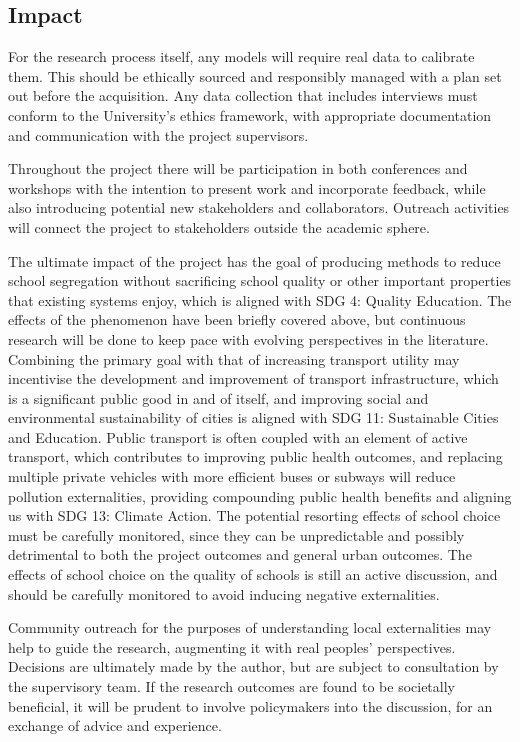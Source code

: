 \documentclass{article}
\begin{document}
\begin{multicols}{2}
\section{Impact}
For the research process itself, any models will require real data to calibrate them. This should be ethically sourced and responsibly managed with a plan set out before the acquisition. Any data collection that includes interviews must conform to the University's ethics framework, with appropriate documentation and communication with the project supervisors.

Throughout the project there will be participation in both conferences and workshops with the intention to present work and incorporate feedback, while also introducing potential new stakeholders and collaborators. Outreach activities will connect the project to stakeholders outside the academic sphere.

The ultimate impact of the project has the goal of producing methods to reduce school segregation without sacrificing school quality or other important properties that existing systems enjoy, which is aligned with SDG 4: Quality Education. The effects of the phenomenon have been briefly covered above, but continuous research will be done to keep pace with evolving perspectives in the literature. Combining the primary goal with that of increasing transport utility may incentivise the development and improvement of transport infrastructure, which is a significant public good in and of itself, and improving social and environmental sustainability of cities is aligned with SDG 11: Sustainable Cities and Education. Public transport is often coupled with an element of active transport, which contributes to improving public health outcomes, and replacing multiple private vehicles with more efficient buses or subways will reduce pollution externalities, providing compounding public health benefits and aligning us with SDG 13: Climate Action. The potential resorting effects of school choice must be carefully monitored, since they can be unpredictable and possibly detrimental to both the project outcomes and general urban outcomes. The effects of school choice on the quality of schools is still an active discussion, and should be carefully monitored to avoid inducing negative externalities.

Community outreach for the purposes of understanding local externalities may help to guide the research, augmenting it with real peoples' perspectives. Decisions are ultimately made by the author, but are subject to consultation by the supervisory team. If the research outcomes are found to be societally beneficial, it will be prudent to involve policymakers into the discussion, for an exchange of advice and experience.


\end{multicols}
\end{document}
